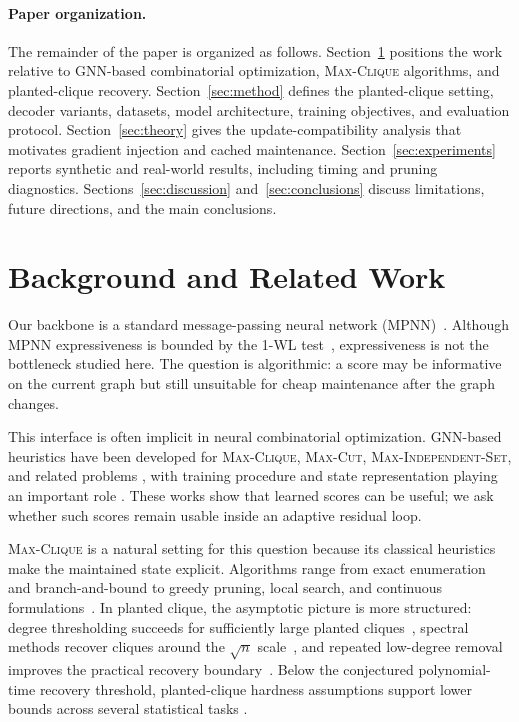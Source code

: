 \documentclass[mathematics,article,submit,pdftex,moreauthors]{Definitions/mdpi}
\begin{document}
\paragraph{Paper organization.}
The remainder of the paper is organized as follows. Section~\ref{sec:related}
positions the work relative to GNN-based combinatorial optimization,
\textsc{Max-Clique} algorithms, and planted-clique recovery. Section~\ref{sec:method}
defines the planted-clique setting, decoder variants, datasets, model architecture,
training objectives, and evaluation protocol. Section~\ref{sec:theory} gives the
update-compatibility analysis that motivates gradient injection and cached
maintenance. Section~\ref{sec:experiments} reports synthetic and real-world results,
including timing and pruning diagnostics. Sections~\ref{sec:discussion}
and~\ref{sec:conclusions} discuss limitations, future directions, and the main
conclusions.

\section{Background and Related Work}
\label{sec:related}

Our backbone is a standard message-passing neural network (MPNN)~\citep{xu2019}.
Although MPNN expressiveness is bounded by the 1-WL test~\citep{xu2019,morris2019},
expressiveness is not the bottleneck studied here. The question is algorithmic:
a score may be informative on the current graph but still unsuitable for cheap
maintenance after the graph changes.

This interface is often implicit in neural combinatorial optimization. GNN-based
heuristics have been developed for \textsc{Max-Clique}, \textsc{Max-Cut},
\textsc{Max-Independent-Set}, and related problems
\citep{karalias2020,min2022,schuetz2022,garmendia2024,tonshoff2021graph}, with
training procedure and state representation playing an important role
\citep{wang2023unsupervised,garmendia2024}. These works show that learned scores can
be useful; we ask whether such scores remain usable inside an adaptive residual
loop.

\textsc{Max-Clique} is a natural setting for this question because its classical
heuristics make the maintained state explicit. Algorithms range from exact
enumeration and branch-and-bound to greedy pruning, local search, and continuous
formulations~\citep{bron1973algorithm,wu2015review,gibbons1997continuous,marino2024short}.
In planted clique, the asymptotic picture is more structured: degree thresholding
succeeds for sufficiently large planted cliques~\citep{kucera1995}, spectral
methods recover cliques around the $\sqrt n$ scale~\citep{alon1998}, and repeated
low-degree removal improves the practical recovery boundary~\citep{feige2010,dekel2014}.
Below the conjectured polynomial-time recovery threshold, planted-clique hardness
assumptions support lower bounds across several statistical tasks
\citep{manurangsi2021,hajek2015}.
\end{document}
